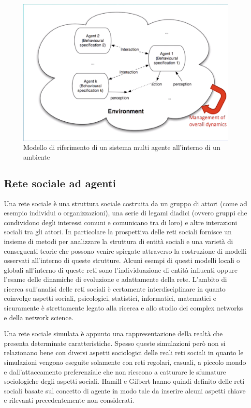 \documentclass[11pt]{article}
\begin{document}
\begin{figure}[H]
    \includegraphics[width=16cm]{resources/agente_modello_riferimento.png}
    \caption{Modello di riferimento di un sistema multi agente all'interno di un ambiente} 
\end{figure}

\subsection{Rete sociale ad agenti}

Una rete sociale \cite{SocialNetworkAnalysis} è una struttura sociale costruita da un gruppo di attori (come ad esempio individui o organizzazioni), una serie di legami diadici (ovvero gruppi che condividono degli interessi comuni e comunicano tra di loro) e altre interazioni sociali tra gli attori. In particolare la prospettiva delle reti sociali fornisce un insieme di metodi per analizzare la struttura di entità sociali e una varietà di conseguenti teorie che possono venire spiegate attraverso la costruzione di modelli osservati all'interno di queste strutture.
Alcuni esempi di questi modelli locali o globali all'interno di queste reti sono l'individuazione di entità influenti oppure l'esame delle dinamiche di evoluzione e adattamente della rete.
L'ambito di ricerca sull'analisi delle reti sociali è certamente interdisciplinare in quanto coinvolge aspetti sociali, psicologici, statistici, informatici, matematici e sicuramente è strettamente legato alla ricerca e allo studio dei complex networks e della network science.

Una rete sociale simulata è appunto una rappresentazione della realtà che presenta determinate caratteristiche. Spesso queste simulazioni però non si relazionano bene con diversi aspetti sociologici delle reali reti sociali in quanto le simulazioni vengono eseguite solamente con reti regolari, casuali, a piccolo mondo e dall'attaccamento preferenziale che non riescono a catturare le sfumature sociologiche degli aspetti sociali. Hamill e Gilbert \cite{SimulatingLargeSocialNetworks} hanno quindi definito delle reti sociali basate sul concetto di agente in modo tale da inserire alcuni aspetti chiave e rilevanti precedentemente non considerati.
\end{document}
